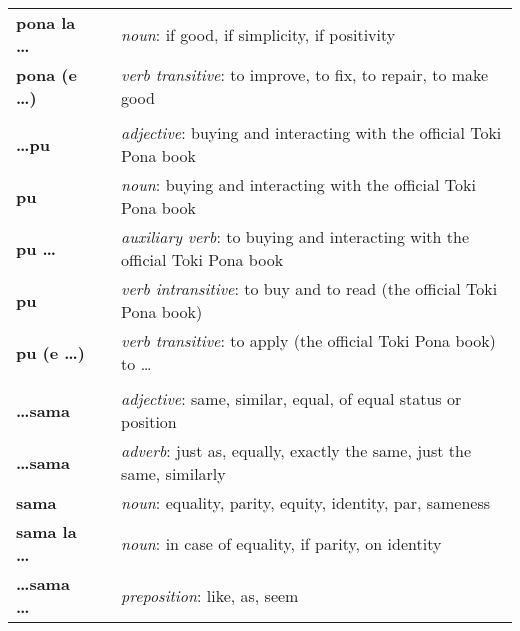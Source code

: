 \begin{supertabular}{p{2,5cm}|ll}
    \textbf{pona la \dots}       &  & \textit{noun}: if good, if simplicity, if positivity                                                       \\
    \textbf{pona (e \dots)}      &  & \textit{verb transitive}: to improve, to fix, to repair, to make good                                      \\
                                 &  &                                                                                                            \\ %
    \textbf{\dots pu}            &  & \textit{adjective}: buying and interacting with the official Toki Pona book                                \\
    \textbf{pu}                  &  & \textit{noun}: buying and interacting with the official Toki Pona book                                     \\
    \textbf{pu \dots}            &  & \textit{auxiliary verb}: to buying and interacting with the official Toki Pona book                        \\
    \textbf{pu}                  &  & \textit{verb intransitive}:  to buy and to read (the official Toki Pona book)                              \\
    \textbf{pu (e \dots)}        &  & \textit{verb transitive}: to apply (the official Toki Pona book) to \dots                                  \\
                                 &  &                                                                                                            \\ %
    \textbf{\dots sama}          &  & \textit{adjective}: same, similar, equal, of equal status or position                                      \\
    \textbf{\dots sama}          &  & \textit{adverb}: just as, equally, exactly the same, just the same, similarly                              \\
    \textbf{sama}                &  & \textit{noun}: equality, parity, equity, identity, par, sameness                                           \\
    \textbf{sama la \dots}       &  & \textit{noun}: in case of equality, if parity, on identity                                                 \\
    \textbf{\dots sama \dots}    &  & \textit{preposition}: like, as, seem                                                                       \\

\end{supertabular}
